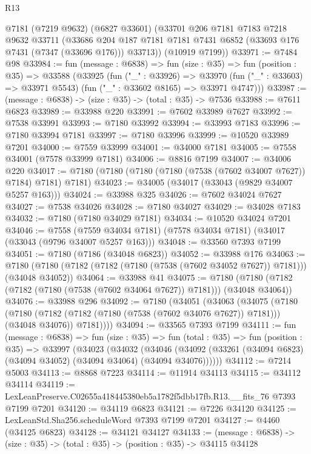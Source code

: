 \begin{lexlean}{R13}
\begin{coremodule}
      @7181
      (@7219 @9632)
      (@6827 @33601)
      (@33701
        @206
        @7181
        @7183
        @7218
        @9632
        @33711
        (@33686 @204 @187 @7181 @7181 @7431 @6852 (@33693 @176 @7431 (@7347 (@33696 @176))) @33713))
      (@10919 @7199))
@33971 := @7484 @98
@33984 := fun (message : @6838) =>
  fun (size : @35) =>
  fun (position : @35) =>
  @33588
    (@33925
      (fun ("_" : @33926) =>
      @33970 (fun ("_" : @33603) => @33971 @5543) (fun ("_" : @33602 @8165) => @33971 @4747)))
@33987 := (message : @6838) -> (size : @35) -> (total : @35) -> @7536
@33988 := @7611 @6823
@33989 := @33988 @220
@33991 := @7602 @33989 @7627
@33992 := @7538 @33991
@33993 := @7180 @33992
@33994 := @33993 @7183
@33996 := @7180 @33994 @7181
@33997 := @7180 @33996
@33999 := @10520 @33989 @7201
@34000 := @7559 @33999
@34001 := @34000 @7181
@34005 := @7558 @34001 (@7578 @33999 @7181)
@34006 := @8816 @7199
@34007 := @34006 @220
@34017 := @7180 (@7180 (@7180 (@7180 (@7538 (@7602 @34007 @7627)) @7184) @7181) @7181)
@34023 := @34005 (@34017 (@33043 (@9829 @34007 @5257 @163)))
@34024 := @33988 @325
@34026 := @7602 @34024 @7627
@34027 := @7538 @34026
@34028 := @7180 @34027
@34029 := @34028 @7183
@34032 := @7180 (@7180 @34029 @7181)
@34034 := @10520 @34024 @7201
@34046 := @7558
    (@7559 @34034 @7181)
    (@7578 @34034 @7181)
    (@34017 (@33043 (@9796 @34007 @5257 @163)))
@34048 := @33560 @7393 @7199
@34051 := @7180 (@7186 (@34048 @6823))
@34052 := @33988 @176
@34063 := @7180 (@7180 (@7182 (@7182 (@7180 (@7538 (@7602 @34052 @7627)) @7181))) (@34048 @34052))
@34064 := @33988 @41
@34075 := @7180 (@7180 (@7182 (@7182 (@7180 (@7538 (@7602 @34064 @7627)) @7181))) (@34048 @34064))
@34076 := @33988 @296
@34092 := @7180
    (@34051
      (@34063
        (@34075
          (@7180
            (@7180 (@7182 (@7182 (@7180 (@7538 (@7602 @34076 @7627)) @7181))) (@34048 @34076))
            @7181))))
@34094 := @33565 @7393 @7199
@34111 := fun (message : @6838) =>
  fun (size : @35) =>
  fun (total : @35) =>
  fun (position : @35) =>
  @33997
    (@34023
      (@34032
        (@34046 (@34092 (@33261 (@34094 @6823) (@34094 @34052) (@34094 @34064) (@34094 @34076))))))
@34112 := @7214 @5003
@34113 := @8868 @7223
@34114 := @11914 @34113
@34115 := @34112 @34114
@34119 := LexLeanPreserve.C02655a418445380eb5a1782f5dbb17fb.R13.__fits_76 @7393 @7199 @7201
@34120 := @34119 @6823
@34121 := @7226 @34120
@34125 := LexLeanStd.Sha256.scheduleWord @7393 @7199 @7201
@34127 := @4460 (@34125 @6823)
@34128 := @34121 @34127
@34133 := (message : @6838) -> (size : @35) -> (total : @35) -> (position : @35) -> @34115 @34128

\end{coremodule}
\end{lexlean}
